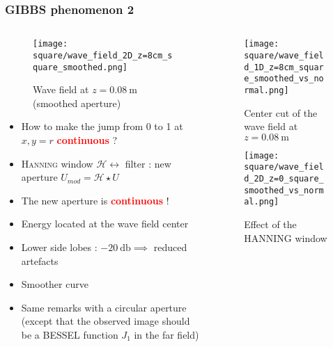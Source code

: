\documentclass[UKenglish,8pt,aspectratio=1610]{beamer}
\begin{document}
	\begin{frame}
		\frametitle{\textsc{GIBBS} phenomenon 2}
		
			\begin{columns}
			\begin{column}{0.5\textwidth}
					\vspace{-20pt}
					\begin{figure}[h!]
					\texttt{[image: square/wave\_field\_2D\_z=8cm\_square\_smoothed.png]}
					\centering
					\caption{Wave field at $z=0.08~\si{\meter}$ (smoothed aperture)}
						\vspace{-10pt}
				\end{figure}
				\begin{itemize}
				\item How to make the jump  from 0 to 1 at $x,y=r$ \textcolor{red}{\textbf{continuous}} ?
				\item \textsc{Hanning} window $\mathcal{H}\longleftrightarrow$ filter : new aperture $U_{mod}=\mathcal{H}\star U$
				\item The new aperture is \textbf{\textcolor{red}{continuous}} !
				\item Energy located at the wave field center
				\item Lower side lobes : $-20~\si{\decibel}\implies$ reduced artefacts 
				\item Smoother curve
				\item Same remarks with a circular aperture (except that the observed image should be a \textsc{BESSEL} function $J_1$ in the far field)
				
			\end{itemize}
			\end{column}
			\begin{column}{0.51\textwidth}
				\vspace{-20pt}
				\begin{figure}[h!]
					\texttt{[image: square/wave\_field\_1D\_z=8cm\_square\_smoothed\_vs\_normal.png]}
					\centering
					\caption{Center cut of the wave field at $z=0.08~\si{\meter}$}
				\end{figure}
			\vspace{-20pt}
			\begin{figure}
				\texttt{[image: square/wave\_field\_2D\_z=0\_square\_smoothed\_vs\_normal.png]}
				\centering
				\caption{Effect of the \textsc{HANNING} window}
			\end{figure}
			\end{column}
		\end{columns}
				
			
		
			
	
	
	\end{frame}
\end{document}

